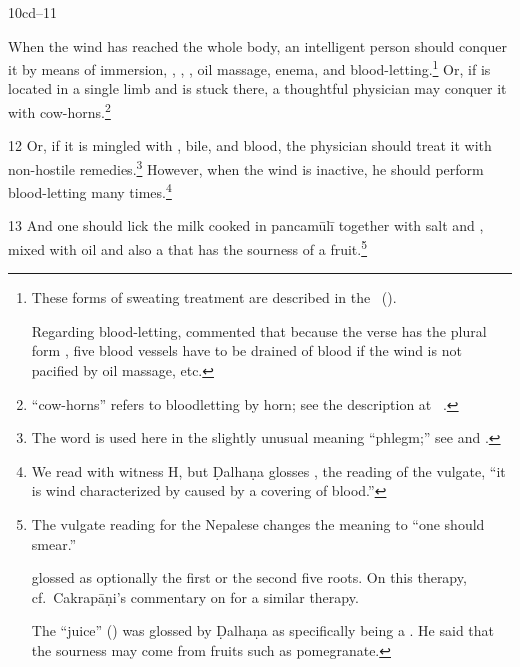 \begin{translation}
    


    \item[10cd--11] 
    
When the wind has reached the whole body, an intelligent person should
conquer it by means of immersion, , , , oil massage, enema, and
blood-letting.\footnote{These forms of sweating treatment are
    described in the \CS\ ().
    
Regarding blood-letting,  commented  that because
the verse has the plural form , five blood vessels
have to be drained of blood if the wind is not pacified by oil
massage, etc.} Or, if is located in a single limb and is stuck there,
a thoughtful physician may conquer it with
cow-horns.\footnote{ “cow-horns” refers to bloodletting by
    horn; see the description at \SS\ .}
        
       
            
    \item[12] Or, if it is mingled with , bile, and
blood, the physician should treat it with non-hostile
remedies.\footnote{The word  is used here in the
    slightly unusual meaning “phlegm;” see  and \cite[553]{josi-maha}.} However, when the
    wind is inactive, he should perform blood-letting many
    times.\footnote{We read  with witness H, but
        Ḍalhaṇa glosses , the reading of the vulgate, “it is
        wind characterized by  caused by a covering
        of blood.”}

    \item[13] And one should lick the milk cooked in \gls{pancamūlī}
together with salt and ,
mixed with oil and also a  that has the sourness of
a fruit.\footnote{The vulgate reading  for the Nepalese 
 changes the meaning to “one should smear.”
    
     glossed  as optionally the first  or 
    the second five roots.  On this therapy, cf.\ Cakrapāṇi's commentary on 
     for a similar therapy.
    
    The “juice” () was glossed by Ḍalhaṇa as specifically
being a .   He said that the sourness
may come from fruits such as pomegranate.
    
}
\end{translation}
